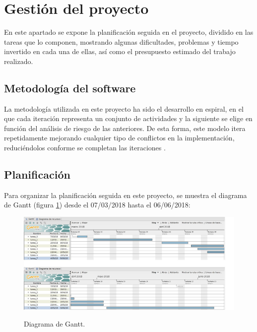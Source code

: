 \section{Gestión del proyecto}
\label{software}
\noindent En este apartado se expone la planificación seguida en el proyecto, dividido en las tareas que lo componen, mostrando algunas dificultades, problemas y tiempo invertido en cada una de ellas, así como el presupuesto estimado del trabajo realizado.

\subsection{Metodología del software}
\noindent La metodología utilizada en este proyecto ha sido el desarrollo en espiral, en el que cada iteración representa un conjunto de actividades y la siguiente se elige en función del análisis de riesgo de las anteriores. De esta forma, este modelo itera repetidamente mejorando cualquier tipo de conflictos en la implementación, reduciéndolos conforme se completan las iteraciones \cite{boehm1988spiral}.

\subsection{Planificación}

\noindent Para organizar la planificación seguida en este proyecto, se muestra el diagrama de Gantt (figura \ref{fig:gantt}) desde el 07/03/2018 hasta el 06/06/2018: \\

\begin{figure}[H]
	\centering
	\includegraphics[width=1.5\textwidth, angle=90]{imagenes/gantt.jpg}
	\label{fig:gantt}
	\caption{Diagrama de Gantt.}
\end{figure}

